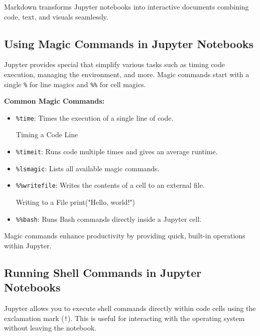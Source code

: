 Markdown transforms Jupyter notebooks into interactive documents combining code, text, and visuals seamlessly.

%
\subsection{Using Magic Commands in Jupyter Notebooks}

Jupyter provides special  that simplify various tasks such as timing code execution, managing the environment, and more. Magic commands start with a single \texttt{\%} for line magics and \texttt{\%\%} for cell magics.

\textbf{Common Magic Commands:}
\begin{itemize}
    \item \texttt{\%time}: Times the execution of a single line of code.
    \begin{codeonly}{Timing a Code Line}
    \end{codeonly}
    \item \texttt{\%timeit}: Runs code multiple times and gives an average runtime.
    \item \texttt{\%lsmagic}: Lists all available magic commands.
    \item \texttt{\%\%writefile}: Writes the contents of a cell to an external file.
\begin{codeonly}{Writing to a File}
print("Hello, world!")
\end{codeonly}
    \item \texttt{\%\%bash}: Runs Bash commands directly inside a Jupyter cell.
\end{itemize}

Magic commands enhance productivity by providing quick, built-in operations within Jupyter.

%
\subsection{Running Shell Commands in Jupyter Notebooks}

Jupyter allows you to execute shell commands directly within code cells using the exclamation mark (\texttt{!}). This is useful for interacting with the operating system without leaving the notebook.


